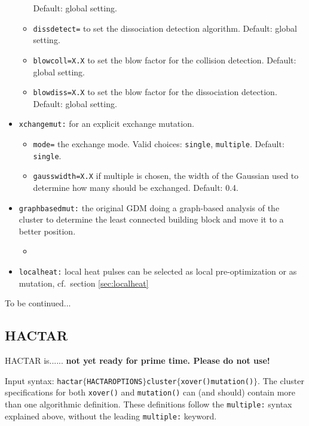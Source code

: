 \documentclass[a4paper,10pt]{scrbook}
\begin{document}
\begin{itemize}
\begin{itemize}
Default: global setting.
    \item \texttt{dissdetect=} to set the dissociation detection algorithm. 
Default: global setting.
    \item \texttt{blowcoll=X.X} to set the blow factor for the collision 
detection. Default: global setting.
    \item \texttt{blowdiss=X.X} to set the blow factor for the dissociation 
detection. Default: global setting.
  \end{itemize}
  \item \texttt{xchangemut:} for an explicit exchange mutation.
  \begin{itemize}
    \item \texttt{mode=} the exchange mode. Valid choices: \texttt{single}, 
\texttt{multiple}. Default: \texttt{single}.
    \item \texttt{gausswidth=X.X} if multiple is chosen, the width of the 
Gaussian used to determine how many should be exchanged. Default: 0.4.
  \end{itemize}
  \item \texttt{graphbasedmut:} the original GDM doing a graph-based analysis 
of the cluster to determine the least connected building block and move it to a 
better position.
  \begin{itemize}
    \item 
  \end{itemize}
\item \texttt{localheat:} local heat pulses can be selected as local
  pre-optimization or as mutation, cf.~section \ref{sec:localheat}
\end{itemize}

To be continued... %


\subsection{HACTAR}
\label{sec:geomhactar}
HACTAR is...... \textbf{not yet ready for prime time. Please do not use!} %

Input syntax: 
\texttt{hactar$\{$HACTAROPTIONS$\}$cluster$\{$xover()mutation()$\}$}.  The 
cluster specifications for both \texttt{xover()} and \texttt{mutation()} can 
(and should) contain more than one algorithmic definition. These definitions 
follow the \texttt{multiple:} syntax explained above, without the leading 
\texttt{multiple:} keyword.
\end{document}
